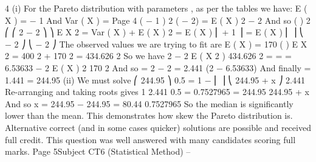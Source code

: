 

4
(i)
For the Pareto distribution with parameters \alpha  , \lambda  as per the tables we have:
E ( X ) =
\lambda 
\alpha  − 1
And
Var ( X ) =
Page 4
\alpha {}
( \alpha  − 1 )
2
( \alpha  − 2)
= E ( X ) 2
\alpha 
\alpha − 2%
And so
( )
2 ⎛  ⎛ 2 \alpha  − 2 ⎞
⎞
E X 2 = Var ( X ) + E ( X ) 2 = E ( X ) ⎜
+ 1 ⎟ = E ( X ) ⎜
⎟
⎝ \alpha − 2 ⎠
⎝ \alpha − 2 ⎠
The observed values we are trying to fit are
E ( X ) = 170
( )
E X 2 = 400 2 + 170 2 = 434.626 2
So we have
2 \alpha  − 2 E ( X 2 ) 434.626 2
=
=
= 6.53633
\alpha  − 2 E ( X ) 2
170 2
And so
\alpha =
2 − 2 
= 2.441
(2 − 6.53633)
And finally \lambda  = 1.441  = 244.95
(ii)
We must solve
⎛ 244.95 ⎞
0.5 = 1 − ⎜
⎟
⎝ 244.95 + x ⎠
2.441
Re-arranging and taking roots gives
1
2.441
0.5
= 0.7527965 =
244.95
244.95 + x
And so
x =
244.95 − 244.95 
= 80.44
0.7527965
So the median is significantly lower than the mean. This demonstrates how
skew the Pareto distribution is.
Alternative correct (and in some cases quicker) solutions are possible and received full
credit. This question was well answered with many candidates scoring full marks.
Page 5Subject CT6 (Statistical Method) – %
